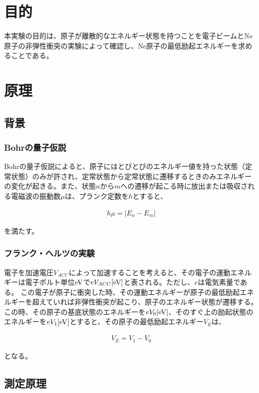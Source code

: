 \documentclass[uplatex,11pt]{jsarticle}
\begin{document}
\section{目的}

本実験の目的は、原子が離散的なエネルギー状態を持つことを電子ビームとNe原子の非弾性衝突の実験によって確認し、Ne原子の最低励起エネルギーを求めることである。

\section{原理}

\subsection{背景}

\subsubsection{Bohrの量子仮説}

Bohrの量子仮説によると、原子にはとびとびのエネルギー値を持った状態（定常状態）のみが許され、定常状態から定常状態に遷移するときのみエネルギーの変化が起きる。また、状態$n$から$m$への遷移が起こる時に放出または吸収される電磁波の振動数$\mu$は、プランク定数を$h$とすると、

\begin{eqnarray*}
    h\mu = \left|E_n - E_m\right|
\end{eqnarray*}

を満たす。

\subsubsection{フランク・ヘルツの実験}

電子を加速電圧$V_{ACC}$によって加速することを考えると、その電子の運動エネルギーは電子ボルト単位${\rm eV}$で$eV_{ACC}[{\rm eV}]$と表される。ただし、$e$は電気素量である。
この電子が原子に衝突した時、その運動エネルギーが原子の最低励起エネルギーを超えていれば非弾性衝突が起こり、原子のエネルギー状態が遷移する。
この時、その原子の基底状態のエネルギーを$eV_0[{\rm eV}]$、そのすぐ上の励起状態のエネルギーを$eV_1[{\rm eV}]$とすると、その原子の最低励起エネルギー$V_E$は、

\begin{eqnarray*}
    V_E = V_1 - V_0
\end{eqnarray*}

となる。

\subsection{測定原理}
\end{document}
